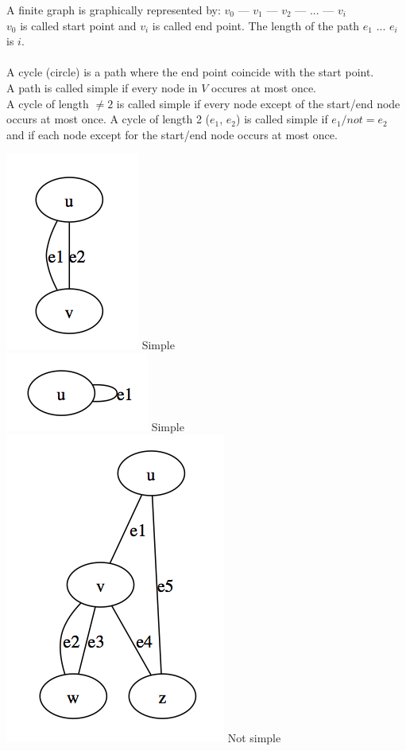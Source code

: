 A finite graph is graphically represented by: $v{_0}$ --- $v{_1}$ --- $v{_2}$ --- ... --- $v{_i}$\\
$v{_0}$ is called start point and $v{_i}$ is called end point. The length of the path $e{_1}$ ... $e{_i}$  is $i$.\\
\\
A cycle (circle) is a path where the end point coincide with the start point.\\
A path is called simple if every node in $V$ occures at most once.\\
A cycle of length $\not = 2$ is called simple if every node except of the start/end node occurs at most once. A cycle of length 2 ($e{_1}$, $e{_2}$) is called simple if $e{_1} /not = e{_2}$ and if each node except for the start/end node occurs at most once.

\begin{example*}
\includegraphics[scale=0.4]{diagrams/Chapter1_Example3}
Simple\\
\includegraphics[scale=0.4]{diagrams/Chapter1_Example4}
Simple\\
\includegraphics[scale=0.45]{diagrams/Chapter1_Example5}
Not simple\\
\end{example*}


